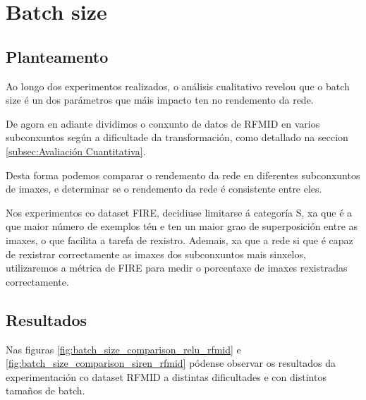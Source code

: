 \section{Batch size}
\label{sec:Batch size}

\subsection{Planteamento}
\label{subsec:Planteamento-batchsize}

Ao longo dos experimentos realizados, o análisis cualitativo revelou que o batch size é un dos parámetros que máis impacto ten no rendemento da rede.

De agora en adiante dividimos o conxunto de datos de RFMID en varios subconxuntos según a dificultade da transformación, como detallado na seccion \ref{subsec:Avaliación Cuantitativa}.

Desta forma podemos comparar o rendemento da rede en diferentes subconxuntos de imaxes, e determinar se o rendemento da rede é consistente entre eles.

Nos experimentos co dataset FIRE, decidiuse limitarse á categoría S, xa que é a que maior número de exemplos tén e ten un maior grao de superposición entre as imaxes, o que facilita a tarefa de rexistro.
Ademais, xa que a rede si que é capaz de rexistrar correctamente as imaxes dos subconxuntos mais sinxelos, utilizaremos a métrica de FIRE para medir o porcentaxe de imaxes rexistradas correctamente.

\subsection{Resultados}
\label{subsec:Resultados-batchsize}

Nas figuras \ref{fig:batch_size_comparison_relu_rfmid} e \ref{fig:batch_size_comparison_siren_rfmid} pódense observar os resultados da experimentación co dataset RFMID a distintas dificultades e con distintos tamaños de batch.


